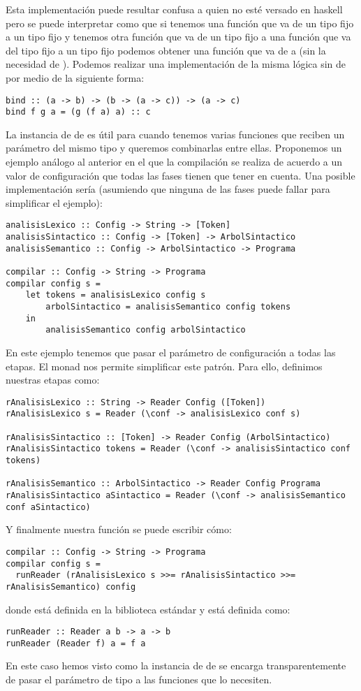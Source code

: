 Esta implementación puede resultar confusa a quien no esté versado
en haskell pero se puede interpretar como que si tenemos una función
que va de un tipo fijo  a un tipo fijo  y tenemos
otra función que va de un tipo fijo  a una función que
va del tipo fijo  a un tipo fijo  podemos obtener
una función que va de  a  (sin la necesidad de ).
Podemos realizar una implementación de la misma
lógica sin  de por medio
de la siguiente forma:
\begin{verbatim}
bind :: (a -> b) -> (b -> (a -> c)) -> (a -> c)
bind f g a = (g (f a) a) :: c
\end{verbatim}

La instancia de  de  es útil para cuando
tenemos varias funciones que reciben un parámetro del mismo tipo
y queremos combinarlas entre ellas. Proponemos un ejemplo análogo
al anterior en el que la compilación se realiza de acuerdo
a un valor de configuración que todas las fases tienen
que tener en cuenta. Una posible implementación sería (asumiendo
que ninguna de las fases puede fallar para
simplificar el ejemplo):
\begin{verbatim}
analisisLexico :: Config -> String -> [Token]
analisisSintactico :: Config -> [Token] -> ArbolSintactico
analisisSemantico :: Config -> ArbolSintactico -> Programa

compilar :: Config -> String -> Programa
compilar config s =
    let tokens = analisisLexico config s
        arbolSintactico = analisisSemantico config tokens
    in
        analisisSemantico config arbolSintactico
\end{verbatim}
En este ejemplo tenemos que pasar el parámetro de configuración
a todas las etapas. El  monad nos permite simplificar
este patrón. Para ello, definimos nuestras etapas como:
\begin{verbatim}
rAnalisisLexico :: String -> Reader Config ([Token])
rAnalisisLexico s = Reader (\conf -> analisisLexico conf s)

rAnalisisSintactico :: [Token] -> Reader Config (ArbolSintactico)
rAnalisisSintactico tokens = Reader (\conf -> analisisSintactico conf tokens)

rAnalisisSemantico :: ArbolSintactico -> Reader Config Programa
rAnalisisSintactico aSintactico = Reader (\conf -> analisisSemantico conf aSintactico)
\end{verbatim}

Y finalmente nuestra función  se puede escribir cómo:
\begin{verbatim}
compilar :: Config -> String -> Programa
compilar config s =
  runReader (rAnalisisLexico s >>= rAnalisisSintactico >>= rAnalisisSemantico) config
\end{verbatim}
donde  está definida en la biblioteca estándar y está
definida como:
\begin{verbatim}
runReader :: Reader a b -> a -> b
runReader (Reader f) a = f a
\end{verbatim}
En este caso hemos visto como la instancia de  de
 se encarga transparentemente de pasar el parámetro
de tipo  a las funciones que lo necesiten.

